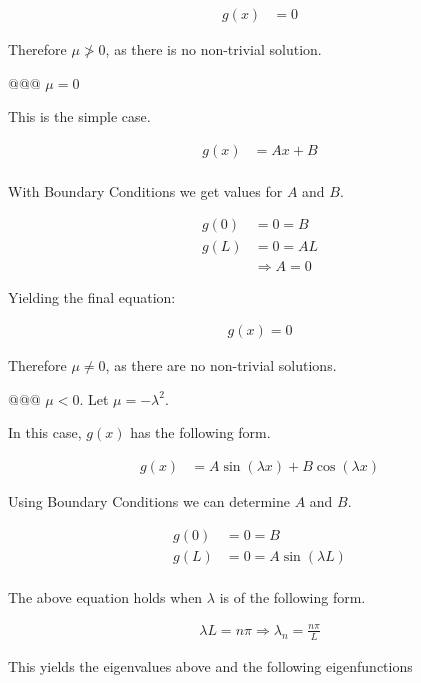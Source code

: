 \documentclass[10pt]{article}
\begin{document}
\begin{easylist}[enumerate]
    \begin{align*}
        g(x) &= 0
    \end{align*}

    Therefore $\mu \not>0$, as there is no non-trivial solution.

    @@@ $\mu = 0$

    This is the simple case.

    \begin{align*}
        g(x) &= Ax + B\\
    \end{align*}

    With Boundary Conditions we get values for $A$ and $B$.

    \begin{align*}
        g(0) &= 0 = B\\
        g(L) &= 0 = AL\\
        &\Rightarrow A = 0
    \end{align*}

    Yielding the final equation:

    \begin{align*}
        g(x) = 0
    \end{align*}

    Therefore $\mu \neq 0$, as there are no non-trivial solutions.

    @@@ $\mu < 0$. Let $\mu = -\lambda^2$.

    In this case, $g(x)$ has the following form.

    \begin{align*}
        g(x) &= A \sin\left( \lambda x \right) + B \cos\left( \lambda x \right)
    \end{align*}

    Using Boundary Conditions we can determine $A$ and $B$.

    \begin{align*}
        g(0) &= 0 = B\\
        g(L) &= 0 = A \sin\left( \lambda L \right)\\
    \end{align*}

    The above equation holds when $\lambda$ is of the following form.

    \begin{align*}
        \lambda L = n \pi \Rightarrow \lambda_n = \frac{n\pi}{L}
    \end{align*}

    This yields the eigenvalues above and the following eigenfunctions


\end{easylist}
\end{document}
